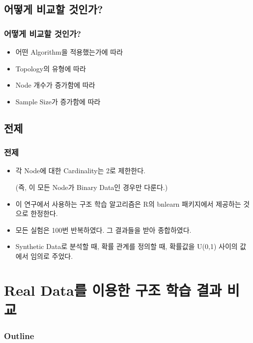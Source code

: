 \documentclass{beamer}
\begin{document}
\subsection{어떻게 비교할 것인가?}
\begin{frame}
\frametitle{어떻게 비교할 것인가?}
{\scriptsize{}
	\begin{itemize}
		\item 어떤 Algorithm을 적용했는가에 따라
		
		\item Topology의 유형에 따라

		\item Node 개수가 증가함에 따라
	
		\item Sample Size가 증가함에 따라
	\end{itemize}
}
\end{frame}



\subsection{전제}
\begin{frame}
\frametitle{전제}
{\scriptsize{}
	\begin{itemize}
		\item 각 Node에 대한 Cardinality는 2로 제한한다.
		
		(즉, 이 모든 Node가 Binary Data인 경우만 다룬다.)
		
		\item 이 연구에서 사용하는 구조 학습 알고리즘은 R의 bnlearn 패키지에서 제공하는 것으로 한정한다.
		
		\item 모든 실험은 100번 반복하였다. 그 결과들을 받아 종합하였다.

		\item Synthetic Data로 분석할 때, 확률 관계를 정의할 때, 확률값을 U(0,1) 사이의 값에서 임의로 주었다.
	\end{itemize}
}
\end{frame}



\section{Real Data를 이용한 구조 학습 결과 비교}
\begin{frame}
\frametitle{Outline}
{\scriptsize{}
	\tableofcontents[currentsection]
}
\end{frame}
\end{document}
